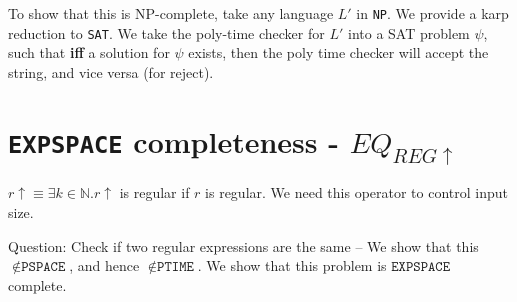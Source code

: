 To show that this is NP-complete, take any language $L'$ in \texttt{NP}. We provide
a karp reduction to \texttt{SAT}. We take the poly-time checker for $L'$ into a
SAT problem $\psi$, such that \textbf{iff} a solution for $\psi$ exists, then the poly
time checker will accept the string, and vice versa (for reject).



\section{\texttt{EXPSPACE} completeness - $EQ_{REG\uparrow}$}
$r \uparrow \equiv \exists k \in \mathbb{N}. r \uparrow$ is regular if $r$ is
regular.  We need this operator to control input size.

Question: Check if two regular expressions are the same -- We show that
this $\notin \texttt{PSPACE}$, and hence $\notin \texttt{PTIME}$. We show that
this problem is $\texttt{EXPSPACE}$ complete.


